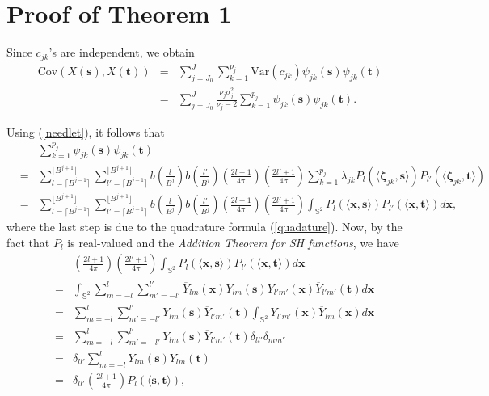 \documentclass[aoas,preprint]{imsart}
\numberwithin{equation}{section}
\theoremstyle{plain}
\begin{document}
\appendix

\section{Proof of Theorem 1}\label{sec: proof_prop1}
Since $c_{jk}$'s are independent, we obtain
\begin{eqnarray}
\mbox{Cov}(X(\textbf{s}), X(\textbf{t})) & = & \sum \limits_{j=J_0}^J \sum \limits_{k=1}^{p_j} \mbox{Var}(c_{jk}) \psi_{jk}(\textbf{s}) \psi_{jk}(\textbf{t}) \nonumber \\
& = & \sum \limits_{j=J_0}^J \frac{\nu_j \sigma_j^2}{\nu_j-2} \sum \limits_{k=1}^{p_j} \psi_{jk}(\textbf{s}) \psi_{jk}(\textbf{t}). \nonumber
\end{eqnarray}

        Using (\ref{needlet}), it follows that
	\begin{eqnarray}
	&& \sum_{k=1}^{p_j} \psi_{jk}(\textbf{s}) \psi_{jk}(\textbf{t}) \nonumber\\
	&=&  \sum \limits_{l=\lceil B^{j-1} \rceil}^{\lfloor B^{j+1} \rfloor}
	\sum \limits_{l'=\lceil B^{j-1} \rceil}^{\lfloor B^{j+1} \rfloor} b\left( \frac{l}{B^j} \right) 
	b\left( \frac{l'}{B^j} \right) \left(\frac{2l+1}{4\pi}\right) \left(\frac{2l'+1}{4\pi}\right)
	\sum_{k=1}^{p_j} \lambda_{jk} P_l(\langle \bm{\zeta}_{jk}, \textbf{s}\rangle) P_{l'}(\langle \bm{\zeta}_{jk}, \textbf{t}\rangle) \nonumber \\
	&=&  \sum \limits_{l=\lceil B^{j-1} \rceil}^{\lfloor B^{j+1} \rfloor}
	\sum \limits_{l'=\lceil B^{j-1} \rceil}^{\lfloor B^{j+1} \rfloor} b\left( \frac{l}{B^j} \right) 
	b\left( \frac{l'}{B^j} \right) \left(\frac{2l+1}{4\pi}\right) \left(\frac{2l'+1}{4\pi}\right)
	\int_{\mathbb{S}^2} P_l(\langle \textbf{x}, \textbf{s}\rangle) P_{l'}(\langle \textbf{x}, \textbf{t}\rangle) d\textbf{x}, \nonumber
	\end{eqnarray}
	where the last step is due to the quadrature formula (\ref{quadature}). Now, by the fact that 
	$P_l$ is real-valued and the \textit{Addition Theorem for SH functions},  we have 
	\begin{eqnarray*}
		&&  \left(\frac{2l+1}{4\pi}\right) \left(\frac{2l'+1}{4\pi}\right)
		\int_{\mathbb{S}^2} P_l(\langle \textbf{x}, \textbf{s}\rangle) P_{l'}(\langle \textbf{x}, \textbf{t}\rangle) d\textbf{x}\\
		&=& \int_{\mathbb{S}^2} \sum_{m=-l}^{l}\sum_{m'=-l'}^{l'} \overline{Y}_{lm}(\textbf{x}) Y_{lm}(\textbf{s}) Y_{l'm'}(\textbf{x}) \overline{Y}_{l'm'}(\textbf{t}) d\textbf{x}\\
		&=& \sum_{m=-l}^{l}\sum_{m'=-l'}^{l'} Y_{lm}(\textbf{s})\overline{Y}_{l'm'}(\textbf{t})
		\int_{\mathbb{S}^2} Y_{l'm'}(\textbf{x}) \overline{Y}_{lm}(\textbf{x}) d\textbf{x}\\
		&=& \sum_{m=-l}^{l}\sum_{m'=-l'}^{l'} Y_{lm}(\textbf{s})\overline{Y}_{l'm'}(\textbf{t}) \delta_{ll'}\delta_{mm'}\\
		&=& \delta_{ll'} \sum_{m=-l}^{l} Y_{lm}(\textbf{s})\overline{Y}_{lm}(\textbf{t})\\
		&=& \delta_{ll'}  \left(\frac{2l+1}{4\pi}\right) P_l(\langle \textbf{s}, \textbf{t}\rangle),
	\end{eqnarray*}
\end{document}

